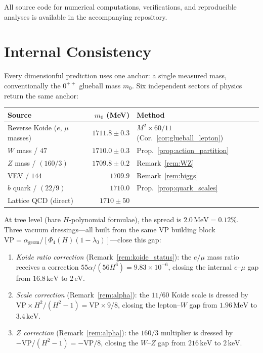 \documentclass[11pt,a4paper]{article}
\theoremstyle{definition}
\theoremstyle{remark}
\begin{document}
All source code for numerical computations, verifications, and reproducible analyses is available in the accompanying repository.


\section{Internal Consistency}\label{sec:consistency}

Every dimensionful prediction uses one anchor: a single measured mass, conventionally the $0^{++}$ glueball mass $m_0$. Six independent sectors of physics return the same anchor:

\begin{center}
\begin{tabular}{lrl}
\toprule
\textbf{Source} & $m_0$ \textbf{(MeV)} & \textbf{Method} \\
\midrule
Reverse Koide ($e$, $\mu$ masses) & $1711.8\pm 0.3$ & $M^2\times 60/11$ (Cor.~\ref{cor:glueball_lepton}) \\
$W$ mass / $47$ & $1710.0\pm 0.3$ & Prop.~\ref{prop:action_partition} \\
$Z$ mass / $(160/3)$ & $1709.8\pm 0.2$ & Remark~\ref{rem:WZ} \\
VEV / $144$ & $1709.9$ & Remark~\ref{rem:higgs} \\
$b$ quark / $(22/9)$ & $1710.0$ & Prop.~\ref{prop:quark_scales} \\
Lattice QCD (direct) & $1710\pm 50$ & \cite{MorningstarPeardon1999} \\
\bottomrule
\end{tabular}
\end{center}

At tree level (bare $H$-polynomial formulae), the spread is $2.0\,\mathrm{MeV}=0.12\%$. Three vacuum dressings---all built from the same VP building block $\mathrm{VP}=\alpha_{\mathrm{geom}}/[\Phi_4(H)(1\!-\!\lambda_0)]$---close this gap:

\begin{enumerate}[nosep]
\item \emph{Koide ratio correction} (Remark~\ref{rem:koide_status}): the $e/\mu$ mass ratio receives a correction $55\alpha/(56H^6)=9.83\times 10^{-6}$, closing the internal $e$--$\mu$ gap from $16.8\,\mathrm{keV}$ to $2\,\mathrm{eV}$.
\item \emph{Scale correction} (Remark~\ref{rem:alpha}): the $11/60$ Koide scale is dressed by $\mathrm{VP}\times H^2/(H^2\!-\!1)=\mathrm{VP}\times 9/8$, closing the lepton--$W$ gap from $1.96\,\mathrm{MeV}$ to $3.4\,\mathrm{keV}$.
\item \emph{$Z$ correction} (Remark~\ref{rem:alpha}): the $160/3$ multiplier is dressed by $-\mathrm{VP}/(H^2\!-\!1)=-\mathrm{VP}/8$, closing the $W$--$Z$ gap from $216\,\mathrm{keV}$ to $2\,\mathrm{keV}$.
\end{enumerate}
\end{document}
